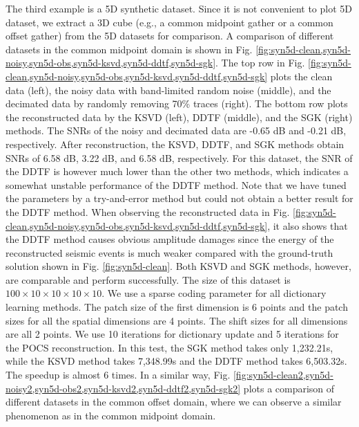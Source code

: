 

The third example is a 5D synthetic dataset. Since it is not convenient to plot 5D dataset, we extract a 3D cube (e.g., a common midpoint gather or a common offset gather) from the 5D datasets for comparison. A comparison of different datasets in the common midpoint domain is shown in Fig. \ref{fig:syn5d-clean,syn5d-noisy,syn5d-obs,syn5d-ksvd,syn5d-ddtf,syn5d-sgk}. The top row in Fig. \ref{fig:syn5d-clean,syn5d-noisy,syn5d-obs,syn5d-ksvd,syn5d-ddtf,syn5d-sgk} plots the clean data (left), the noisy data with band-limited random noise (middle), and the decimated data by randomly removing 70\% traces (right). The bottom row plots the reconstructed data by the KSVD (left), DDTF (middle), and the SGK (right) methods. The SNRs of the noisy and decimated data are -0.65 dB and -0.21 dB, respectively. After reconstruction, the KSVD, DDTF, and SGK methods obtain SNRs of 6.58 dB, 3.22 dB, and 6.58 dB, respectively. For this dataset, the SNR of the DDTF is however much lower than the other two methods, which indicates a somewhat unstable performance of the DDTF method. Note that we have tuned the parameters by a try-and-error method but could not obtain a better result for the DDTF method. When observing the reconstructed data in Fig. \ref{fig:syn5d-clean,syn5d-noisy,syn5d-obs,syn5d-ksvd,syn5d-ddtf,syn5d-sgk}, it also shows that the DDTF method causes obvious amplitude damages since the energy of the reconstructed seismic events is much weaker compared with the ground-truth solution shown in Fig. \ref{fig:syn5d-clean}. Both KSVD and SGK methods, however, are comparable and perform successfully. The size of this dataset is $100\times10\times10\times10\times10$. We use a sparse coding parameter  for all dictionary learning methods. The patch size of the first dimension is 6 points and the patch sizes for all the spatial dimensions are 4 points. The shift sizes for all dimensions are all 2 points. 
We use 10 iterations for dictionary update and 5 iterations for the POCS reconstruction. In this test, the SGK method takes only 1,232.21s, while the KSVD method takes 7,348.99s and the DDTF method takes 6,503.32s.  The speedup is almost 6 times. In a similar way, Fig. \ref{fig:syn5d-clean2,syn5d-noisy2,syn5d-obs2,syn5d-ksvd2,syn5d-ddtf2,syn5d-sgk2} plots a comparison of different datasets in the common offset domain, where we can observe a similar phenomenon as in the common midpoint domain. 

